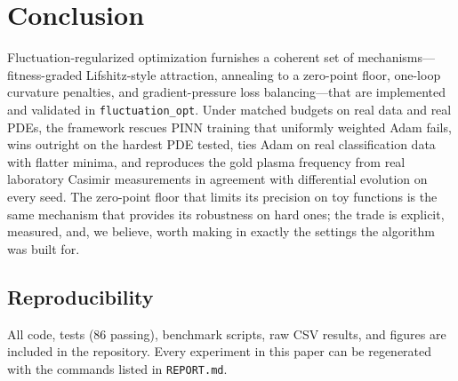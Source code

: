 \documentclass[10pt,twocolumn]{article}
\begin{document}
\section{Conclusion}

Fluctuation-regularized optimization furnishes a coherent set of mechanisms---fitness-graded
Lifshitz-style attraction, annealing to a zero-point floor, one-loop curvature penalties, and
gradient-pressure loss balancing---that are implemented and validated in \texttt{fluctuation\_opt}. Under
matched budgets on real data and real PDEs, the framework rescues PINN training that uniformly
weighted Adam fails, wins outright on the hardest PDE tested, ties Adam on real classification
data with flatter minima, and reproduces the gold plasma frequency from real laboratory Casimir
measurements in agreement with differential evolution on every seed. The zero-point floor that
limits its precision on toy functions is the same mechanism that provides its robustness on
hard ones; the trade is explicit, measured, and, we believe, worth making in exactly the
settings the algorithm was built for.

\subsection*{Reproducibility}

All code, tests (86 passing), benchmark scripts, raw CSV results, and figures are included in
the repository. Every experiment in this paper can be regenerated with the commands listed in
\texttt{REPORT.md}.
\end{document}
